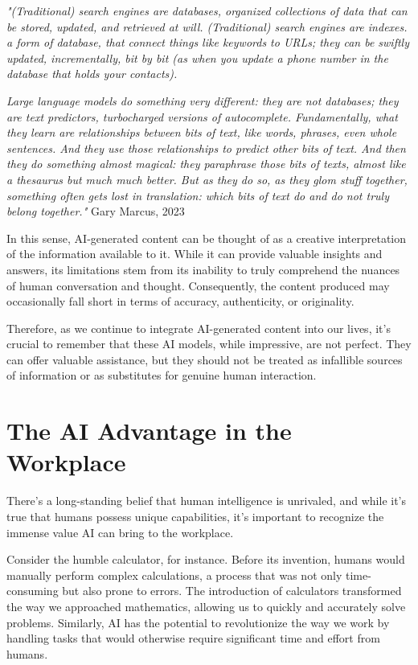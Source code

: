 \textit{"(Traditional) search engines are databases, organized collections of data that can be stored, updated, and retrieved at will. (Traditional) search engines are indexes. a form of database, that connect things like keywords to URLs; they can be swiftly updated, incrementally, bit by bit (as when you update a phone number in the database that holds your contacts).}

\textit{Large language models do something very different: they are not databases; they are text predictors, turbocharged versions of autocomplete. Fundamentally, what they learn are relationships between bits of text, like words, phrases, even whole sentences. And they use those relationships to predict other bits of text. And then they do something almost magical: they paraphrase those bits of texts, almost like a thesaurus but much much better. But as they do so, as they glom stuff together, something often gets lost in translation: which bits of text do and do not truly belong together."} Gary Marcus, 2023 \cite{marcus2023}

In this sense, AI-generated content can be thought of as a creative interpretation of the information available to it. While it can provide valuable insights and answers, its limitations stem from its inability to truly comprehend the nuances of human conversation and thought. Consequently, the content produced may occasionally fall short in terms of accuracy, authenticity, or originality.

Therefore, as we continue to integrate AI-generated content into our lives, it's crucial to remember that these AI models, while impressive, are not perfect. They can offer valuable assistance, but they should not be treated as infallible sources of information or as substitutes for genuine human interaction.

\section{The AI Advantage in the Workplace}

There's a long-standing belief that human intelligence is unrivaled, and while it's true that humans possess unique capabilities, it's important to recognize the immense value AI can bring to the workplace.

Consider the humble calculator, for instance. Before its invention, humans would manually perform complex calculations, a process that was not only time-consuming but also prone to errors. The introduction of calculators transformed the way we approached mathematics, allowing us to quickly and accurately solve problems. Similarly, AI has the potential to revolutionize the way we work by handling tasks that would otherwise require significant time and effort from humans.


